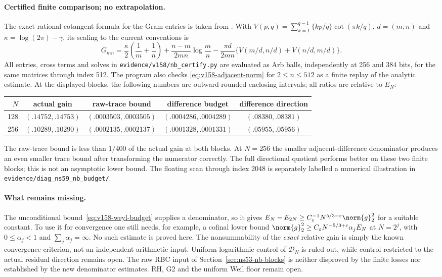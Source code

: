 \paragraph{Certified finite comparison; no extrapolation.}
The exact rational-cotangent formula for the Gram entries is taken from
\cite[Proposition 89]{BaezDuarteAutocorrelation2003}. With
$V(p,q)=\sum_{k=1}^{q-1}\{kp/q\}\cot(\pi k/q)$, $d=(m,n)$ and
$\kappa=\log(2\pi)-\gamma$, its scaling to the current conventions is
\begin{equation}
 G_{mn}=\frac\kappa2\left(\frac1m+\frac1n\right)
 +\frac{n-m}{2mn}\log\frac mn
 -\frac{\pi d}{2mn}\{V(m/d,n/d)+V(n/d,m/d)\}.
 \label{eq:v158-cot-gram}
\end{equation}
All entries, cross terms and solves in \texttt{evidence/v158/nb\_certify.py}
are evaluated as Arb balls, independently at 256 and 384 bits, for the
same matrices through index 512. The program also checks
\eqref{eq:v158-adjacent-norm} for $2\leq n\leq512$ as a finite replay
of the analytic estimate. At the displayed blocks, the following numbers
are outward-rounded enclosing intervals; all ratios are relative to $E_N$:
\begin{center}
\begin{tabular}{rcccc}
\toprule
$N$ & actual gain & raw-trace bound & difference budget & difference direction\\
\midrule
128 & $(.14752,.14753)$ & $(.0003503,.0003505)$
    & $(.0004286,.0004289)$ & $(.08380,.08381)$\\
256 & $(.10289,.10290)$ & $(.0002135,.0002137)$
    & $(.0001328,.0001331)$ & $(.05955,.05956)$\\
\bottomrule
\end{tabular}
\end{center}
The raw-trace bound is less than $1/400$ of the actual gain at both
blocks. At $N=256$ the smaller adjacent-difference denominator produces
an even smaller trace bound after transforming the numerator correctly.
The full directional quotient performs better on these two finite blocks;
this is not an asymptotic lower bound. The floating scan through index
2048 is separately labelled a numerical illustration in
\texttt{evidence/diag\_ns59\_nb\_budget/}.

\paragraph{What remains missing.}
The unconditional bound~\eqref{eq:v158-weyl-budget} supplies a denominator,
so it gives $E_N-E_{2N}\geq C_\varepsilon^{-1}
N^{5/3-\varepsilon}\norm{g}_2^2$ for a suitable constant.
To use it for convergence one still needs, for example, a cofinal lower
bound $\norm{g}_2^2\geq C_\varepsilon N^{-5/3+\varepsilon}
\alpha_j E_N$ at $N=2^j$, with $0\leq\alpha_j<1$ and
$\sum_j\alpha_j=\infty$. No such estimate is proved here.
The nonsummability of the \emph{exact} relative gain is simply the known
convergence criterion, not an independent arithmetic input.
Uniform logarithmic control of $\mathcal D_N$ is ruled out, while control
restricted to the actual residual direction remains open. The raw RBC
input of Section~\ref{sec:ns53-nb-blocks} is neither disproved by the
finite losses nor established by the new denominator estimates.
RH, G2 and the uniform Weil floor remain open.
